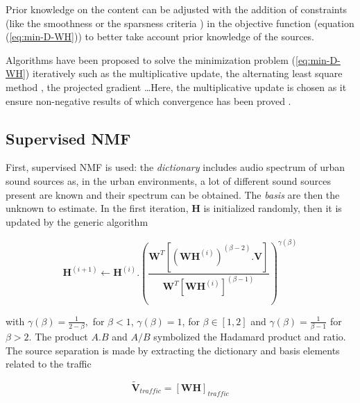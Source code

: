 \documentclass[twocolumn,a4paper,10pt]{article}
\begin{document}
Prior knowledge on the content can be adjusted with the addition of constraints (like the smoothness or the sparsness criteria \cite{virtanen_monaural_2007}) in the objective function (equation (\ref{eq:min-D-WH})) to better take account prior knowledge of the sources.

Algorithms have been proposed to solve the minimization problem (\ref{eq:min-D-WH}) iteratively such as the multiplicative update, the alternating least square method \cite{cichocki_regularized_2007}, the projected gradient \cite{lin_projected_2007} \dots Here, the multiplicative update is chosen \cite{lee_algorithms_2000} as it ensure non-negative results of which convergence has been proved \cite{fevotte_algorithms_2011}.

\subsection{Supervised NMF}
First, supervised NMF is used: the \textit{dictionary} includes audio spectrum of urban sound sources as, in the urban environments, a lot of different sound sources present are known and their spectrum can be obtained. The \textit{basis} are then the unknown to estimate. In the first iteration, $\mathbf{H}$ is initialized randomly, then it is updated by the generic algorithm

\begin{equation}
\textbf{H}^{(i+1)} \leftarrow \textbf{H}^{(i)}.\left(\frac{\textbf{W}^T \left[\left(\textbf{WH}^{(i)} \right)^{(\beta-2)}.\textbf{V} \right]}{\textbf{W}^T \left[\textbf{WH}^{(i)} \right]^{(\beta-1)}}\right)^{\gamma(\beta)}
\end{equation}

with $\gamma(\beta) = \frac{1}{2-\beta},$ for $\beta < 1$, $ \gamma(\beta) = 1$, for $\beta \in \left[1,2\right]$ and $\gamma(\beta) = \frac{1}{\beta-1}$ for $\beta > 2$. The product $A.B$ and $A/B$ symbolized the Hadamard product and ratio. The source separation is made by extracting the dictionary and basis elements related to the traffic

\begin{equation}\label{eq:separationExtraction}
\mathbf{\tilde{V}}_{traffic} = \left[ \mathbf{WH} \right]_{traffic}
\end{equation}

%
%
%
\end{document}

